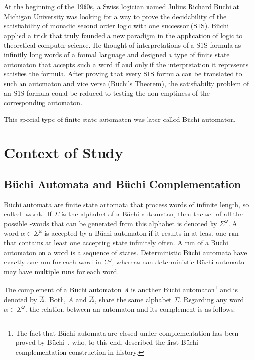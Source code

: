 At the beginning of the 1960s, a Swiss logician named Julius Richard Büchi at Michigan University was looking for a way to prove the decidability of the satisfiability of monadic second order logic with one successor (S1S). Büchi applied a trick that truly founded a new paradigm in the application of logic to theoretical computer science. He thought of interpretations of a S1S formula as infinitly long words of a formal language and designed a type of finite state automaton that accepts such a word if and only if the interpretation it represents satisfies the formula. After proving that every S1S formula can be translated to such an automaton and vice versa (Büchi's Theorem), the satisfiabilty problem of an S1S formula could be reduced to testing the non-emptiness of the corresponding automaton.

This special type of finite state automaton was later called Büchi automaton.

\section{Context of Study}


\subsection{Büchi Automata and Büchi Complementation}

Büchi automata are finite state automata that process words of infinite length, so called \om-words. If $\Sigma$ is the alphabet of a Büchi automaton, then the set of all the possible \om-words that can be generated from this alphabet is denoted by $\Sigma^\omega$. A word $\alpha \in \Sigma^\omega$ is accepted by a Büchi automaton if it results in at least one run that contains at least one accepting state infinitely often. A run of a Büchi automaton on a word is a sequence of states. Deterministic Büchi automata have exactly one run for each word in $\Sigma^\omega$, whereas non-deterministic Büchi automata may have multiple runs for each word.

The complement of a Büchi automaton $A$ is another Büchi automaton\footnote{The fact that Büchi automata are closed under complementation has been proved by Büchi~\cite{buchi1960decision}, who, to this end, described the first Büchi complementation construction in history.} and is denoted by $\cl1{A}$. Both, $A$ and $\cl1{A}$, share the same alphabet $\Sigma$. Regarding any word $\alpha \in \Sigma^\omega$, the relation between an automaton and its complement is as follows:

